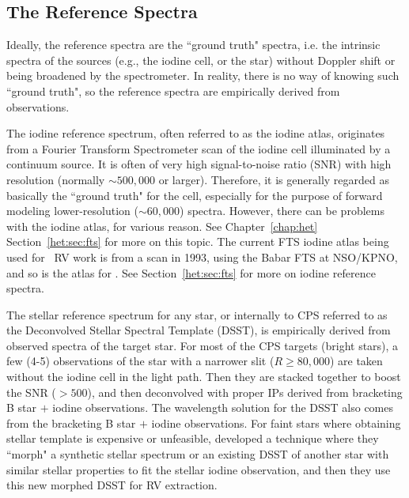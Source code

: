 \subsection{The Reference Spectra}\label{doppler:sec:reference}

Ideally, the reference spectra are the ``ground truth" spectra,
i.e. the intrinsic spectra of the sources (e.g., the iodine cell, or
the star) without Doppler shift or being broadened by the
spectrometer. In reality, there is no way of knowing such ``ground
truth", so the reference spectra are empirically derived from
observations.

The iodine reference spectrum, often referred to as the iodine atlas,
originates from a Fourier Transform Spectrometer scan of the iodine
cell illuminated by a continuum source. It is often of very high
signal-to-noise ratio (SNR) with high resolution (normally $\sim
500,000$ or larger). Therefore, it is generally regarded as basically
the ``ground truth" for the cell, especially for the purpose of
forward modeling lower-resolution ($\sim 60,000$) spectra. However,
there can be problems with the iodine atlas, for various reason. See
Chapter~\ref{chap:het} Section~\ref{het:sec:fts} for more on this
topic. The current FTS iodine atlas being used for \keck\ RV work is
from a scan in 1993, using the Babar FTS at NSO/KPNO, and so is the
atlas for \het. See Section~\ref{het:sec:fts} for more on iodine
reference spectra.

The stellar reference spectrum for any star, or internally to CPS
referred to as the Deconvolved Stellar Spectral Template (DSST), is
empirically derived from observed spectra of the target star. For most
of the CPS targets (bright stars), a few (4-5) observations of the
star with a narrower slit ($R \geq 80,000$) are taken without the
iodine cell in the light path. Then they are stacked together to boost
the SNR ($>500$), and then deconvolved with proper IPs derived from
bracketing B star $+$ iodine observations. The wavelength solution for
the DSST also comes from the bracketing B star $+$ iodine
observations. For faint stars where obtaining stellar
template is expensive or unfeasible, \cite{2006ApJ...647..600J}
developed a technique where they ``morph" a synthetic stellar spectrum
or an existing DSST of another star with similar stellar properties to
fit the stellar iodine observation, and then they use this new morphed
DSST for RV extraction.


